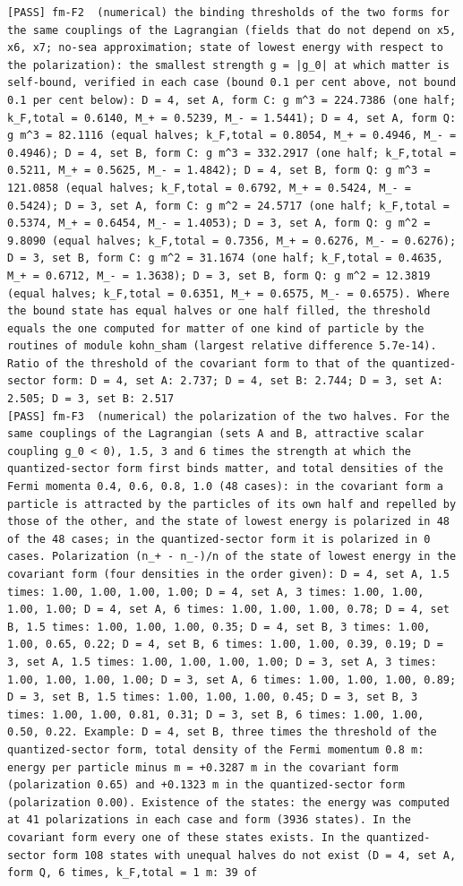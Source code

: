 \documentclass[
  10pt,
]{article}
\begin{document}
\begin{verbatim}
[PASS] fm-F2  (numerical) the binding thresholds of the two forms for the same couplings of the Lagrangian (fields that do not depend on x5, x6, x7; no-sea approximation; state of lowest energy with respect to the polarization): the smallest strength g = |g_0| at which matter is self-bound, verified in each case (bound 0.1 per cent above, not bound 0.1 per cent below): D = 4, set A, form C: g m^3 = 224.7386 (one half; k_F,total = 0.6140, M_+ = 0.5239, M_- = 1.5441); D = 4, set A, form Q: g m^3 = 82.1116 (equal halves; k_F,total = 0.8054, M_+ = 0.4946, M_- = 0.4946); D = 4, set B, form C: g m^3 = 332.2917 (one half; k_F,total = 0.5211, M_+ = 0.5625, M_- = 1.4842); D = 4, set B, form Q: g m^3 = 121.0858 (equal halves; k_F,total = 0.6792, M_+ = 0.5424, M_- = 0.5424); D = 3, set A, form C: g m^2 = 24.5717 (one half; k_F,total = 0.5374, M_+ = 0.6454, M_- = 1.4053); D = 3, set A, form Q: g m^2 = 9.8090 (equal halves; k_F,total = 0.7356, M_+ = 0.6276, M_- = 0.6276); D = 3, set B, form C: g m^2 = 31.1674 (one half; k_F,total = 0.4635, M_+ = 0.6712, M_- = 1.3638); D = 3, set B, form Q: g m^2 = 12.3819 (equal halves; k_F,total = 0.6351, M_+ = 0.6575, M_- = 0.6575). Where the bound state has equal halves or one half filled, the threshold equals the one computed for matter of one kind of particle by the routines of module kohn_sham (largest relative difference 5.7e-14). Ratio of the threshold of the covariant form to that of the quantized-sector form: D = 4, set A: 2.737; D = 4, set B: 2.744; D = 3, set A: 2.505; D = 3, set B: 2.517
[PASS] fm-F3  (numerical) the polarization of the two halves. For the same couplings of the Lagrangian (sets A and B, attractive scalar coupling g_0 < 0), 1.5, 3 and 6 times the strength at which the quantized-sector form first binds matter, and total densities of the Fermi momenta 0.4, 0.6, 0.8, 1.0 (48 cases): in the covariant form a particle is attracted by the particles of its own half and repelled by those of the other, and the state of lowest energy is polarized in 48 of the 48 cases; in the quantized-sector form it is polarized in 0 cases. Polarization (n_+ - n_-)/n of the state of lowest energy in the covariant form (four densities in the order given): D = 4, set A, 1.5 times: 1.00, 1.00, 1.00, 1.00; D = 4, set A, 3 times: 1.00, 1.00, 1.00, 1.00; D = 4, set A, 6 times: 1.00, 1.00, 1.00, 0.78; D = 4, set B, 1.5 times: 1.00, 1.00, 1.00, 0.35; D = 4, set B, 3 times: 1.00, 1.00, 0.65, 0.22; D = 4, set B, 6 times: 1.00, 1.00, 0.39, 0.19; D = 3, set A, 1.5 times: 1.00, 1.00, 1.00, 1.00; D = 3, set A, 3 times: 1.00, 1.00, 1.00, 1.00; D = 3, set A, 6 times: 1.00, 1.00, 1.00, 0.89; D = 3, set B, 1.5 times: 1.00, 1.00, 1.00, 0.45; D = 3, set B, 3 times: 1.00, 1.00, 0.81, 0.31; D = 3, set B, 6 times: 1.00, 1.00, 0.50, 0.22. Example: D = 4, set B, three times the threshold of the quantized-sector form, total density of the Fermi momentum 0.8 m: energy per particle minus m = +0.3287 m in the covariant form (polarization 0.65) and +0.1323 m in the quantized-sector form (polarization 0.00). Existence of the states: the energy was computed at 41 polarizations in each case and form (3936 states). In the covariant form every one of these states exists. In the quantized-sector form 108 states with unequal halves do not exist (D = 4, set A, form Q, 6 times, k_F,total = 1 m: 39 of

\end{verbatim}
\end{document}
